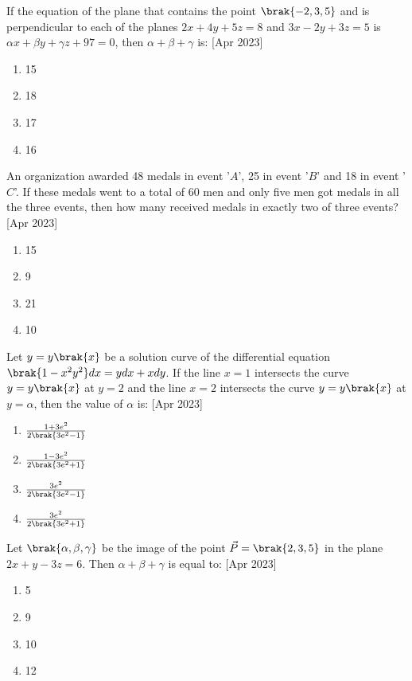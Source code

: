 
\iffalse
  \title{April:2023}
  \author{AI24BTECH11016}
  \section{mcq-single}
\fi
	\item
	If the equation of the plane that contains the point $\brak{-2, 3, 5}$ and is perpendicular to each of the planes $2x + 4y + 5z = 8$ and $3x - 2y + 3z = 5$ is $\alpha x + \beta y + \gamma z + 97 = 0$, then $\alpha + \beta + \gamma$ is:
	\hfill [Apr 2023]
		\begin{enumerate}
			\item 15
			\item 18
			\item 17
			\item 16
		\end{enumerate}

	\item
	An organization awarded 48 medals in event '$A$', 25 in event '$B$' and 18 in event '$C$'. If these medals went to a total of 60 men and only five men got medals in all the three events, then how many received medals in exactly two of three events?
	\hfill [Apr 2023]
		\begin{enumerate}
			\item 15
			\item 9
			\item 21
			\item 10
		\end{enumerate}

	\item
	Let $y = y\brak{x}$ be a solution curve of the differential equation $\brak{1 - x^{2}y^{2}}dx = y dx + x dy$. If the line $x = 1$ intersects the curve $y = y\brak{x}$ at $y = 2$ and the line $x = 2$ intersects the curve $y = y\brak{x}$ at $y = \alpha$, then the value of $\alpha$ is:
	\hfill [Apr 2023]
		\begin{enumerate}
			\item $\frac{1+3e^{2}}{2\brak{3e^{2}-1}}$
			\item $\frac{1-3e^{2}}{2\brak{3e^{2}+1}}$
			\item $\frac{3e^{2}}{2\brak{3e^{2}-1}}$
			\item $\frac{3e^{2}}{2\brak{3e^{2}+1}}$
		\end{enumerate}

	\item 
	Let $\brak{\alpha, \beta, \gamma}$ be the image of the point $\vec{P} = \brak{2, 3, 5}$ in the plane $2x + y - 3z = 6$. Then $\alpha + \beta + \gamma$ is equal to:
	\hfill [Apr 2023]
		\begin{enumerate}
			\item 5
			\item 9
			\item 10
			\item 12
		\end{enumerate}

